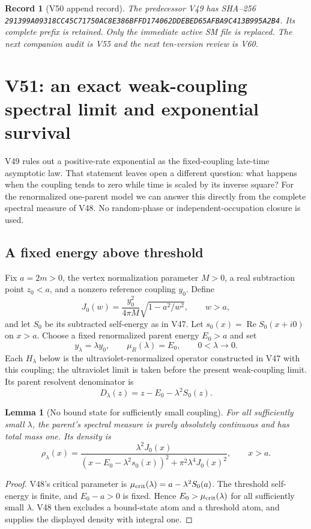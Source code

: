 \documentclass[11pt]{article}
\newtheorem{lemma}[theorem]{Lemma}
\newtheorem{record}[theorem]{Record}
\theoremstyle{remark}
\begin{document}
\begin{record}[V50 append record]
\label{rec:v20v50}
The predecessor V49 has SHA--256
\texttt{291399A09318CC45C71750AC8E386BFFD174062DDEBED65AFBA9C413B995A2B4}.
Its complete prefix is retained.  Only the immediate active
SM file is replaced.  The next companion audit is V55 and
the next ten-version review is V60.
\end{record}



\section{V51: an exact weak-coupling spectral limit and exponential survival}
\label{sec:v20v51}

V49 rules out a positive-rate exponential as the fixed-coupling
late-time asymptotic law.  That statement leaves open a different
question: what happens when the coupling tends to zero while time
is scaled by its inverse square?  For the renormalized one-parent
model we can answer this directly from the complete spectral measure
of V48.  No random-phase or independent-occupation closure is used.

\subsection{A fixed energy above threshold}

Fix \(a=2m>0\), the vertex normalization parameter \(M>0\),
a real subtraction point \(z_0<a\), and a nonzero reference
coupling \(y_0\).  Define
\[
 J_0(w)=\frac{y_0^2}{4\pi M}\sqrt{1-a^2/w^2},\qquad w>a,
\]
and let \(S_0\) be its subtracted self-energy as in V47.
Let \(s_0(x)=\operatorname{Re}S_0(x+i0)\) on \(x>a\).
Choose a fixed renormalized parent energy \(E_0>a\) and set
\[
 y_\lambda=\lambda y_0,\qquad \mu_R(\lambda)=E_0,
 \qquad 0<\lambda\to0.
\]
Each \(H_\lambda\) below is the ultraviolet-renormalized
operator constructed in V47 with this coupling; the ultraviolet
limit is taken before the present weak-coupling limit.
Its parent resolvent denominator is
\[
 D_\lambda(z)=z-E_0-\lambda^2S_0(z).
\]

\begin{lemma}[No bound state for sufficiently small coupling]
\label{lem:v20v51-noatom}
For all sufficiently small \(\lambda\), the parent's spectral
measure is purely absolutely continuous and has total mass one.
Its density is
\[
 \rho_\lambda(x)=
 \frac{\lambda^2J_0(x)}
 {(x-E_0-\lambda^2s_0(x))^2+\pi^2\lambda^4J_0(x)^2},
 \qquad x>a.
\]
\end{lemma}
\begin{proof}
V48's critical parameter is
\(\mu_{\rm crit}(\lambda)=a-\lambda^2S_0(a)\).
The threshold self-energy is finite, and \(E_0-a>0\)
is fixed.  Hence \(E_0>\mu_{\rm crit}(\lambda)\) for
all sufficiently small \(\lambda\).
V48 then excludes a bound-state atom and a threshold atom,
and supplies the displayed density with integral one.
\end{proof}
\end{document}
